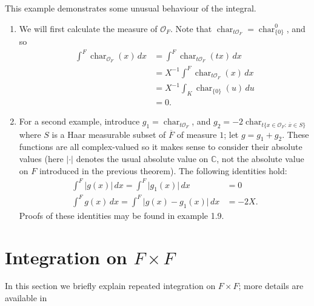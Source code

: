 \documentclass{lmsMODIFIED}
\newcommand{\bb}[1]{\mathbb{#1}}
\newcommand{\abs}[1]{\vert#1\vert}
\newcommand{\roi}{\mathcal{O}}
\newcommand{\res}[1]{\overline{#1}}
\DeclareMathOperator{\Char}{char}
\begin{document}
\begin{example}\label{eg_null_functions}
This example demonstrates some unusual behaviour of the integral.
\begin{enumerate}
\item We will first calculate the measure of $\roi_{F}$. Note that $\Char_{t\roi_{F}}=\Char_{\{0\}}^0$, and so
\begin{align*}
	\int^F \Char_{\roi_{F}}(x)\,dx
	&=\int^F \Char_{t\roi_{F}}(tx)\,dx\\
	&=X^{-1}\int^F \Char_{t\roi_{F}}(x)\,dx\\
	&=X^{-1}\int_K\Char_{\{0\}}(u)\,du\\
	&=0.
	\end{align*}
\item For a second example, introduce $g_1=\Char_{t\roi_{F}}$, and $g_2=-2\Char_{t\{x\in\roi_{F}:\,\res{x}\in S\}}$ where $S$ is a Haar measurable subset of $\res{F}$ of measure $1$; let $g=g_1+g_2$. These functions are all complex-valued so it makes sense to consider their absolute values (here $\abs{\cdot}$ denotes the usual absolute value on $\bb{C}$, not the absolute value on $F$ introduced in the previous theorem). The following identities hold:
\begin{align*}
	\int^F \abs{g(x)} \,dx=\int^F\abs{g_1(x)}\,dx&=0\\
	\int^F g(x)\,dx=\int^F \abs{g(x)-g_1(x)}\,dx&=-2X.
\end{align*}
Proofs of these identities may be found in \cite{Morrow2008} example 1.9.
\end{enumerate}
\end{example}
%
%
\section{Integration on $F\times F$}
In this section we briefly explain repeated integration on $F\times F$; more details are available in \cite{Morrow2008a}
\end{document}
